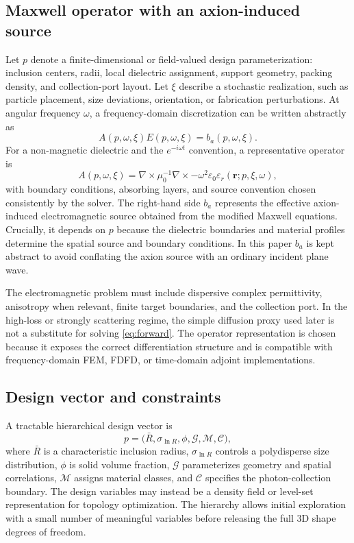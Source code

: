 \documentclass[10.5pt,a4paper]{article}
\newcommand{\eps}{\varepsilon}
\begin{document}
\subsection{Maxwell operator with an axion-induced source}
Let $p$ denote a finite-dimensional or field-valued design parameterization: inclusion centers, radii, local dielectric assignment, support geometry, packing density, and collection-port layout. Let $\xi$ describe a stochastic realization, such as particle placement, size deviations, orientation, or fabrication perturbations. At angular frequency $\omega$, a frequency-domain discretization can be written abstractly as
\begin{equation}
A(p,\omega,\xi)E(p,\omega,\xi)=b_a(p,\omega,\xi).
\label{eq:forward}
\end{equation}
For a non-magnetic dielectric and the $e^{-i\omega t}$ convention, a representative operator is
\begin{equation}
A(p,\omega,\xi)=\nabla\times\mu_0^{-1}\nabla\times-\omega^2\eps_0\eps_r(\mathbf r;p,\xi,\omega),
\label{eq:maxwellop}
\end{equation}
with boundary conditions, absorbing layers, and source convention chosen consistently by the solver. The right-hand side $b_a$ represents the effective axion-induced electromagnetic source obtained from the modified Maxwell equations. Crucially, it depends on $p$ because the dielectric boundaries and material profiles determine the spatial source and boundary conditions. In this paper $b_a$ is kept abstract to avoid conflating the axion source with an ordinary incident plane wave.

The electromagnetic problem must include dispersive complex permittivity, anisotropy when relevant, finite target boundaries, and the collection port. In the high-loss or strongly scattering regime, the simple diffusion proxy used later is not a substitute for solving \cref{eq:forward}. The operator representation is chosen because it exposes the correct differentiation structure and is compatible with frequency-domain FEM, FDFD, or time-domain adjoint implementations.

\subsection{Design vector and constraints}
A tractable hierarchical design vector is
\begin{equation}
p=\bigl(\bar R,\sigma_{\ln R},\phi,\mathcal G,\mathcal M,\mathcal C\bigr),
\label{eq:designvector}
\end{equation}
where $\bar R$ is a characteristic inclusion radius, $\sigma_{\ln R}$ controls a polydisperse size distribution, $\phi$ is solid volume fraction, $\mathcal G$ parameterizes geometry and spatial correlations, $\mathcal M$ assigns material classes, and $\mathcal C$ specifies the photon-collection boundary. The design variables may instead be a density field or level-set representation for topology optimization. The hierarchy allows initial exploration with a small number of meaningful variables before releasing the full 3D shape degrees of freedom.
\end{document}
